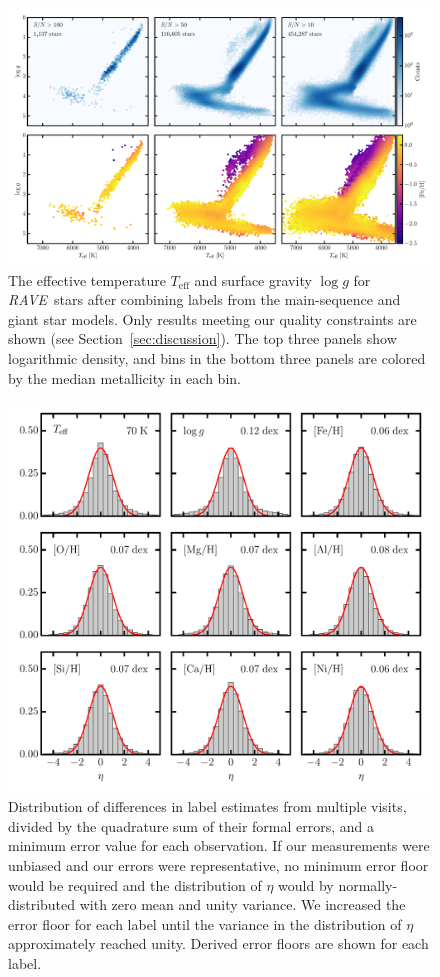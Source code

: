 \documentclass[preprint]{aastex}
\newcommand{\acronym}[1]{{\small{#1}}}
\newcommand{\project}[1]{\textsl{#1}}
\newcommand{\rave}{\project{\acronym{RAVE}}}
\newcommand{\teff}{T_{\mathrm{eff}}}
\newcommand{\logg}{\log g}
\begin{document}
\begin{figure}[p]
\includegraphics[width=\textwidth]{hrd-test-set.pdf}
\caption{The effective temperature $\teff$ and surface gravity $\logg$ for \rave\ stars after combining labels from the main-sequence and giant star models.  Only results meeting our quality constraints are shown (see Section~\ref{sec:discussion}). The top three panels show logarithmic density, and bins in the bottom three panels are colored by the median metallicity in each bin.\label{fig:test-set-hrd}}
\end{figure}


\begin{figure}[p]
\includegraphics[width=\textwidth]{pairwise-metrics.pdf}
\caption{Distribution of differences in label estimates from multiple visits, divided by the quadrature sum of their formal errors, and a minimum error value for each observation.  If our measurements were unbiased and our errors were representative, no minimum error floor would be required and the distribution of $\eta$ would by normally-distributed with zero mean and unity variance. 
We increased the error floor for each label until the variance in the distribution of $\eta$ approximately reached unity. Derived error floors are shown for each label.\label{fig:pairwise-comparison}}
\end{figure}
\end{document}
